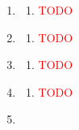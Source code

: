 \begin{enumerate}[label=(\roman*)]

    \item 

        \begin{multicols}{2}
        \begin{enumerate}[label=(\alph*)]
            \item \textcolor{red}{TODO} 
        \end{enumerate}
        \end{multicols}

    \item 

        \begin{multicols}{2}
        \begin{enumerate}[label=(\alph*)]
            \item \textcolor{red}{TODO} 
        \end{enumerate}
        \end{multicols}

    \item 

        \begin{multicols}{2}
        \begin{enumerate}[label=(\alph*)]
            \item \textcolor{red}{TODO} 
        \end{enumerate}
        \end{multicols}

    \item 

        \begin{multicols}{2}
        \begin{enumerate}[label=(\alph*)]
            \item \textcolor{red}{TODO} 
        \end{enumerate}
        \end{multicols}

    \item 


\end{enumerate}
